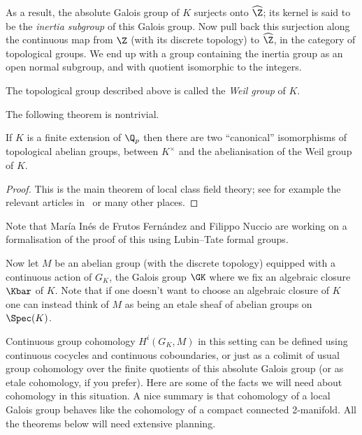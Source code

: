 As a result, the absolute Galois group of $K$ surjects onto $\widehat{\Z}$; its kernel is said to be the \emph{inertia subgroup} of this Galois group. Now pull back this surjection along the continuous map from $\Z$ (with its discrete topology) to $\widehat{\Z}$, in the category of topological groups. We end up with a group containing the inertia group as an open normal subgroup, and with quotient isomorphic to the integers.

\begin{definition}\label{local_Weil_group}\notready The topological group described above is called the \emph{Weil group} of $K$.
\end{definition}

The following theorem is nontrivial.

\begin{theorem}\label{local_class_field_theory}\notready If $K$ is a finite extension of $\Q_p$ then there are two ``canonical'' isomorphisms of topological abelian groups, between $K^\times$ and the abelianisation of the Weil group of $K$.
\end{theorem}
\begin{proof} This is the main theorem of local class field theory; see for example the relevant articles in~\cite{cf} or many other places.
\end{proof}

Note that Mar\'ia In\'es de Frutos Fern\'andez and Filippo Nuccio are working on a formalisation of the proof of this using Lubin--Tate formal groups.

Now let $M$ be an abelian group (with the discrete topology) equipped with a continuous
action of $G_K$, the Galois group $\GK$ where we fix an algebraic closure $\Kbar$ of $K$. Note that
if one doesn't want to choose an algebraic closure of $K$ one can instead think of $M$ as being an
etale sheaf of abelian groups on $\Spec(K)$.

Continuous group cohomology $H^i(G_K,M)$ in this setting can be defined using continuous cocycles and continuous coboundaries, or just as a colimit of usual group cohomology over the finite quotients of this absolute Galois group (or as etale cohomology, if you prefer). Here are some of the facts we will need about cohomology in this situation. A nice summary is that cohomology of a local Galois group behaves like the cohomology of a compact connected 2-manifold. All the theorems below will need extensive planning.

